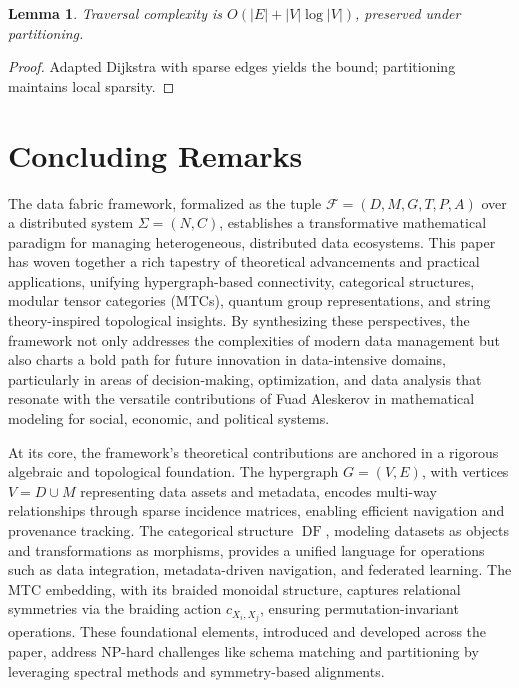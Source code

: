 \documentclass{amsart}
\newtheorem{lem}{Lemma}
\newcommand\cF{\mathcal{F}}
\DeclareMathOperator\DF{DF}
\begin{document}
\begin{lem} \label{lem:traversal_efficiency}
Traversal complexity is \( O(|E| + |V| \log |V|) \), preserved under partitioning.
\end{lem}
\begin{proof}
Adapted Dijkstra with sparse edges yields the bound; partitioning maintains local sparsity.
\end{proof}

 \section{Concluding Remarks} \label{sec:conclusion}
The data fabric framework, formalized as the tuple \( \cF = (D, M, G, T, P, A) \) over a distributed system \( \Sigma = (N, C) \), establishes a transformative mathematical paradigm for managing heterogeneous, distributed data ecosystems. This paper has woven together a rich tapestry of theoretical advancements and practical applications, unifying hypergraph-based connectivity, categorical structures, modular tensor categories (MTCs), quantum group representations, and string theory-inspired topological insights. By synthesizing these perspectives, the framework not only addresses the complexities of modern data management but also charts a bold path for future innovation in data-intensive domains, particularly in areas of decision-making, optimization, and data analysis that resonate with the versatile contributions of Fuad Aleskerov in mathematical modeling for social, economic, and political systems.

At its core, the framework’s theoretical contributions are anchored in a rigorous algebraic and topological foundation. The hypergraph \( G = (V, E) \), with vertices \( V = D \cup M \) representing data assets and metadata, encodes multi-way relationships through sparse incidence matrices, enabling efficient navigation and provenance tracking. The categorical structure \( \DF \), modeling datasets as objects and transformations as morphisms, provides a unified language for operations such as data integration, metadata-driven navigation, and federated learning. The MTC embedding, with its braided monoidal structure, captures relational symmetries via the braiding action \( c_{X_i, X_j} \), ensuring permutation-invariant operations. These foundational elements, introduced and developed across the paper, address NP-hard challenges like schema matching and partitioning by leveraging spectral methods and symmetry-based alignments.
\end{document}
